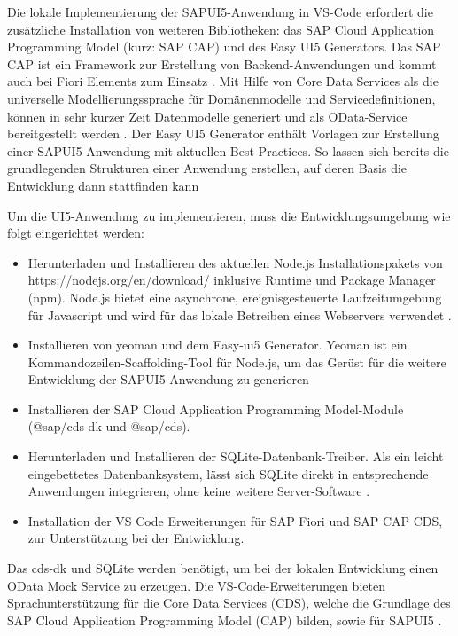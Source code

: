Die lokale Implementierung der SAPUI5-Anwendung in VS-Code erfordert die zusätzliche Installation von weiteren Bibliotheken: das SAP Cloud Application Programming Model (kurz: SAP CAP) und des Easy UI5 Generators. Das SAP CAP ist ein Framework zur Erstellung von Backend-Anwendungen und kommt auch bei Fiori Elements zum Einsatz \cite{cap:ov}. Mit Hilfe von Core Data Services als die universelle Modellierungssprache für Domänenmodelle und Servicedefinitionen, können in sehr kurzer Zeit Datenmodelle generiert und als OData-Service bereitgestellt werden \cite{cap:ov}. Der Easy UI5 Generator enthält Vorlagen zur Erstellung einer SAPUI5-Anwendung mit aktuellen Best Practices. So lassen sich bereits die grundlegenden Strukturen einer Anwendung erstellen, auf deren Basis die Entwicklung dann stattfinden kann \cite{cap:geui5} 

Um die UI5-Anwendung zu implementieren, muss die Entwicklungsumgebung wie folgt eingerichtet werden:
\begin{itemize}[noitemsep]
\item Herunterladen und Installieren des aktuellen Node.js Installationspakets von https://nodejs.org/en/download/ inklusive Runtime und Package Manager (npm). Node.js bietet eine asynchrone, ereignisgesteuerte Laufzeitumgebung für Javascript und wird für das lokale Betreiben eines Webservers verwendet \cite{wiki:nodejs}.
\item Installieren von yeoman und dem Easy-ui5 Generator. Yeoman ist ein Kommandozeilen-Scaffolding-Tool für Node.js, um das Gerüst für die weitere Entwicklung der SAPUI5-Anwendung zu generieren 
\item Installieren der SAP Cloud Application Programming Model-Module (@sap/cds-dk und @sap/cds). 
\item Herunterladen und Installieren der SQLite-Datenbank-Treiber. Als ein leicht eingebettetes Datenbanksystem, lässt sich SQLite direkt in entsprechende Anwendungen integrieren, ohne keine weitere Server-Software \cite{wiki:sqlite}.
\item Installation der VS Code Erweiterungen für SAP Fiori und SAP CAP CDS, zur Unterstützung bei der Entwicklung.
\end{itemize}

Das cds-dk und SQLite werden benötigt, um bei der lokalen Entwicklung einen OData Mock Service zu erzeugen. Die VS-Code-Erweiterungen bieten Sprachunterstützung für die Core Data Services (CDS), welche die Grundlage des SAP Cloud Application Programming Model (CAP) bilden, sowie für SAPUI5 \cite{vsc:cdsext}.

